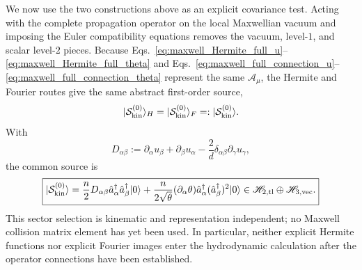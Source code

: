 \documentclass[11pt,oneside]{article}
\numberwithin{equation}{section}
\theoremstyle{definition}
\begin{document}
We now use the two constructions above as an explicit covariance test.  Acting with the complete propagation operator on the local Maxwellian vacuum and imposing the Euler compatibility equations removes the vacuum, level-$1$, and scalar level-$2$ pieces.  Because Eqs.~\eqref{eq:maxwell_Hermite_full_u}--\eqref{eq:maxwell_Hermite_full_theta} and Eqs.~\eqref{eq:maxwell_full_connection_u}--\eqref{eq:maxwell_full_connection_theta} represent the same $\mathcal A_\mu$, the Hermite and Fourier routes give the same abstract first-order source,
\begin{equation}
|\mathcal S_{\rm kin}^{(0)}\rangle_H
=
|\mathcal S_{\rm kin}^{(0)}\rangle_F
=:
|\mathcal S_{\rm kin}^{(0)}\rangle.
\label{eq:maxwell_source_HF_equivalence}
\end{equation}
With
\begin{equation}
D_{\alpha\beta}
:=\partial_\alpha u_\beta+\partial_\beta u_\alpha
-\frac{2}{d}\delta_{\alpha\beta}\partial_\gamma u_\gamma,
\label{eq:maxwell_Dab}
\end{equation}
the common source is
\begin{equation}
\boxed{
|\mathcal S_{\rm kin}^{(0)}\rangle
=
\frac n2 D_{\alpha\beta}
\hat a_\alpha^\dagger\hat a_\beta^\dagger|0\rangle
+
\frac{n}{2\sqrt\theta}(\partial_\alpha\theta)
\hat a_\alpha^\dagger(\hat a_\beta^\dagger)^2|0\rangle
\in
\mathscr H_{2,\mathrm{tl}}\oplus\mathscr H_{3,\mathrm{vec}}.
}
\label{eq:maxwell_kinetic_source_Fock}
\end{equation}
This sector selection is kinematic and representation independent; no Maxwell collision matrix element has yet been used.  In particular, neither explicit Hermite functions nor explicit Fourier images enter the hydrodynamic calculation after the operator connections have been established.
\end{document}
